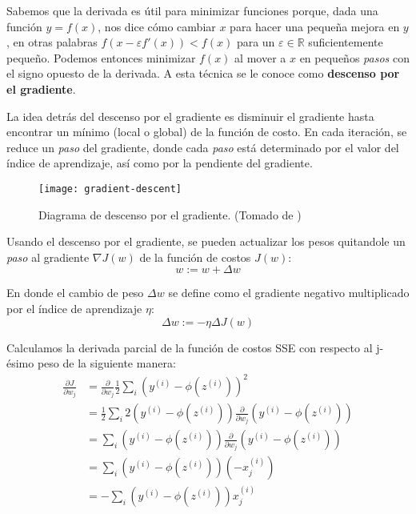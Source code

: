 Sabemos que la derivada es útil para minimizar funciones porque, dada
una función $y = f(x)$, nos dice cómo cambiar $x$ para hacer una
pequeña mejora en $y$, en otras palabras $f(x-\varepsilon f'(x)) <
f(x)$ para un $\varepsilon \in \mathbb{R}$ suficientemente
pequeño. Podemos entonces minimizar $f(x)$ al mover a $x$ en pequeños
\textit{pasos} con el signo opuesto de la derivada. A esta técnica se
le conoce como \textbf{descenso por el gradiente}.

La idea detrás del descenso por el gradiente es disminuir el gradiente hasta encontrar
un mínimo (local o global) de la función de costo. En cada iteración, se reduce
un \textit{paso} del gradiente, donde cada \textit{paso} está determinado por
el valor del índice de aprendizaje, así como por la pendiente del gradiente.

\begin{figure}[H]
\begin{center}
  \texttt{[image: gradient-descent]}
  \caption{Diagrama de descenso por el gradiente. (Tomado de \cite{python})}
\end{center}
\end{figure}

Usando el descenso por el gradiente, se pueden actualizar los pesos quitandole un \textit{paso}
al gradiente $\nabla J(w)$ de la función de costos $J(w)$:
\begin{equation}
  w := w + \Delta w
\end{equation}

En donde el cambio de peso $\Delta w$ se define como el gradiente negativo multiplicado
por el índice de aprendizaje $\eta$:
\begin{equation}
  \Delta w := -\eta \Delta J(w)
\end{equation}

Calculamos la derivada parcial de la función de costos SSE con respecto al
j-ésimo peso de la siguiente manera:
\begin{equation*}
\begin{split}
  \frac{\partial J}{\partial w_j} &= \frac{\partial}{\partial w_j}\frac{1}{2}\sum_i (y^{(i)} - \phi(z^{(i)}))^2 \\
  &= \frac{1}{2}\sum_i 2(y^{(i)} - \phi(z^{(i)}))\frac{\partial}{\partial w_j}(y^{(i)} - \phi(z^{(i)}))\\
  &= \sum_i (y^{(i)} - \phi(z^{(i)}))\frac{\partial}{\partial w_j}(y^{(i)} - \phi (z^{(i)}))\\
  &= \sum_i(y^{(i)} - \phi(z^{(i)}))(-x_j^{(i)})\\
  &= -\sum_i(y^{(i)} - \phi(z^{(i)}))x_j^{(i)}
\end{split}
\end{equation*}

